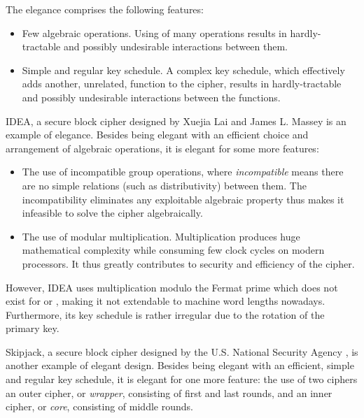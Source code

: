 \documentclass[a4paper,oneside,english]{amsart}
\numberwithin{equation}{section}
\numberwithin{figure}{section}
\begin{document}
The elegance comprises the following features: 
\begin{itemize}
\item Few algebraic operations. Using of many operations results in hardly-tractable
and possibly undesirable interactions between them.
\item Simple and regular key schedule. A complex key schedule, which effectively
adds another, unrelated, function to the cipher, results in hardly-tractable
and possibly undesirable interactions between the functions.
\end{itemize}
IDEA, a secure block cipher designed by Xuejia Lai and James L. Massey
\cite{LM91,LMM91} is an example of elegance. Besides being elegant
with an efficient choice and arrangement of algebraic operations,
it is elegant for some more features: 
\begin{itemize}
\item The use of incompatible group operations, where \emph{incompatible}
means there are no simple relations (such as distributivity) between
them. The incompatibility eliminates any exploitable algebraic property
thus makes it infeasible to solve the cipher algebraically.
\item The use of modular multiplication. Multiplication produces huge mathematical
complexity while consuming few clock cycles on modern processors.
It thus greatly contributes to security and efficiency of the cipher.
\end{itemize}
However, IDEA uses multiplication modulo the Fermat prime 
which does not exist for  or , making it not extendable
to machine word lengths nowadays. Furthermore, its key schedule is
rather irregular due to the rotation of the primary key.

Skipjack, a secure block cipher designed by the U.S. National Security
Agency \cite{NSA98}, is another example of elegant design. Besides
being elegant with an efficient, simple and regular key schedule,
it is elegant for one more feature: the use of two ciphers \textemdash{}
an outer cipher, or \emph{wrapper}, consisting of first and last rounds,
and an inner cipher, or \emph{core}, consisting of middle rounds.
\end{document}
